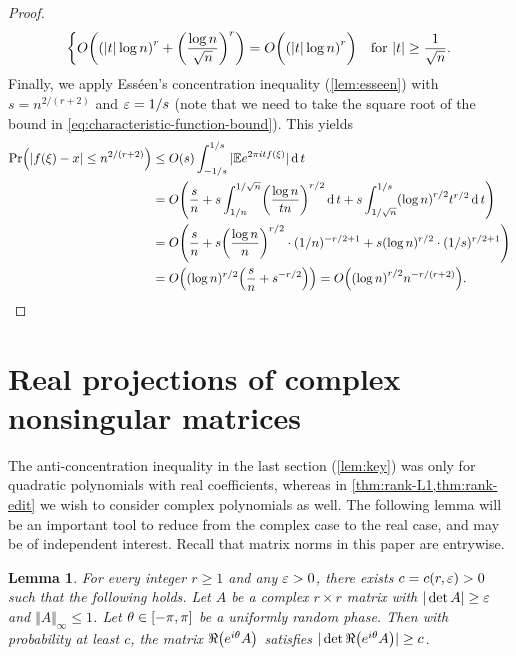 \documentclass{daj}
\theoremstyle{plain}
\theoremstyle{plain}
\newtheorem{lem}[thm]{Lemma}
\theoremstyle{plain}
\theoremstyle{plain}
\theoremstyle{definition}
\theoremstyle{plain}
\theoremstyle{plain}
\theoremstyle{definition}
\theoremstyle{definition}
\theoremstyle{plain}
\let\originalleft\left
\let\originalright\right
\renewcommand{\left}{\mathopen{}\mathclose\bgroup\originalleft}
\renewcommand{\right}{\aftergroup\egroup\originalright}
\begin{document}
\begin{proof}
\begin{align}
\begin{cases}
{\displaystyle O\left(\left(|t|\log n\right)^{r}+\left(\frac{\log n}{\sqrt n}\right)^{r}\right)=O\left(\vphantom{\int}\left(\left|t\right|\log n\right)^{r}\right)} & \text{for }\left|t\right|\ge{\displaystyle \frac{1}{\sqrt{n}}}.
\end{cases}\label{eq:characteristic-function-bound}
\end{align}
Finally, we apply Ess\'een's concentration inequality (\cref{lem:esseen}) with $s=n^{2/(r+2)}$ and $\varepsilon=1/s$ (note that we need to take the square root of the bound in \cref{eq:characteristic-function-bound}). This yields
\begin{align*}
\Pr\left(\left|f(\xi)-x\right|\le n^{2/(r+2)}\right) &\le O\left(s\right)\int_{-1/s}^{1/s}\vert\E e^{2\pi itf(\xi)}\vert\d t\\
&=O\left(\frac{s}{n}+s\int_{1/n}^{1/\sqrt{n}}\left(\frac{\log n}{t n}\right)^{r/2}\d t+s\int_{1/\sqrt{n}}^{1/s}\left(\log n\right)^{r/2}t^{r/2}\d t\right)\\
&=O\left(\frac{s}{n}+s\left(\frac{\log n}{n}\right)^{r/2}\cdot (1/n)^{-r/2+1}+s(\log n)^{r/2}\cdot (1/s)^{r/2+1}\right)\\
&=O\left((\log n)^{r/2}\left(\frac{s}{n}+s^{-r/2}\right)\right)=O\left(\left(\log n\right)^{r/2}n^{-r/(r+2)}\right).\tag*{\qedhere}
\end{align*}
\end{proof}

\section{Real projections of complex nonsingular matrices}\label{sec:complex-to-real}

The anti-concentration inequality in the last section (\cref{lem:key}) was only for quadratic polynomials with real coefficients, whereas in \cref{thm:rank-L1,thm:rank-edit} we wish to consider complex polynomials as well. The following lemma will be an important tool to reduce from the complex case to the real case, and may be of independent interest. Recall that matrix norms in this paper are entrywise.
\begin{lem}
\label{lem:L1-real-to-complex}For every integer $r\geq 1$ and any $\varepsilon>0$, there exists $c=c(r,\varepsilon)>0$ such that the following holds. Let $A$ be a complex $r\times r$ matrix with $\vert \det A\vert\geq \varepsilon$ and $\Vert A\Vert_\infty\le 1$. Let $\theta\in\left[-\pi,\pi\right]$ be a uniformly random phase. Then with probability at least $c$, the matrix $\Re\left(e^{i\theta}A\right)$ satisfies $\vert \det \Re\left(e^{i\theta}A\right)\vert\geq c$.
\end{lem}
\end{document}
